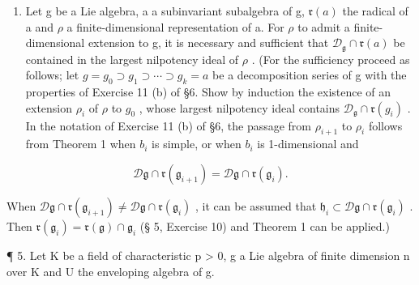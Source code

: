 \begin{enumerate}
\def\labelenumi{\arabic{enumi}.}
\setcounter{enumi}{3}
\tightlist
\item
  Let g be a Lie algebra, a a subinvariant subalgebra of g, \(\mathfrak{r}(a)\) the radical of a and \(\rho\) a finite-dimensional representation of a. For \(\rho\) to admit a finite-dimensional extension to g, it is necessary and sufficient that \(\mathcal{D}_{\mathfrak{g}} \cap \mathfrak{r}(a)\) be contained in the largest nilpotency ideal of \(\rho\) . (For the sufficiency proceed as follows; let \(g = g_{0} \supset g_{1} \supset \cdots \supset g_{k} = a\) be a decomposition series of g with the properties of Exercise 11 (b) of §6. Show by induction the existence of an extension \(\rho_{i}\) of \(\rho\) to \(g_{0}\) , whose largest nilpotency ideal contains \(\mathcal{D}_{\mathfrak{g}} \cap \mathfrak{r}(g_{i})\) . In the notation of Exercise 11 (b) of §6, the passage from \(\rho_{i+1}\) to \(\rho_{i}\) follows from Theorem 1 when \(b_{i}\) is simple, or when \(b_{i}\) is 1-dimensional and
\end{enumerate}

\[
\mathscr {D} \mathfrak {g} \cap \mathfrak {r} (\mathfrak {g} _ {i + 1}) = \mathscr {D} \mathfrak {g} \cap \mathfrak {r} (\mathfrak {g} _ {i}).
\]

When \(\mathcal{D}\mathfrak{g} \cap \mathfrak{r}(\mathfrak{g}_{i+1}) \neq \mathcal{D}\mathfrak{g} \cap \mathfrak{r}(\mathfrak{g}_i)\) , it can be assumed that \(\mathfrak{h}_i \subset \mathcal{D}\mathfrak{g} \cap \mathfrak{r}(\mathfrak{g}_i)\) . Then \(\mathfrak{r}(\mathfrak{g}_i) = \mathfrak{r}(\mathfrak{g}) \cap \mathfrak{g}_i\) (§ 5, Exercise 10) and Theorem 1 can be applied.)

¶ 5. Let K be a field of characteristic p \textgreater{} 0, g a Lie algebra of finite dimension n over K and U the enveloping algebra of g.

